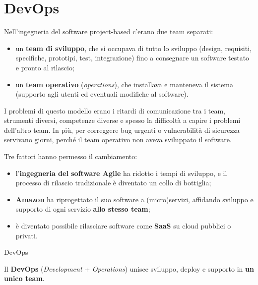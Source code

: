 \chapter{DevOps}\label{ch-10}


Nell'ingegneria del software project-based c'erano due team separati:

\begin{itemize}
\tightlist
\item
  un \textbf{team di sviluppo}, che si occupava di tutto lo sviluppo
  (design, requisiti, specifiche, prototipi, test, integrazione) fino a
  consegnare un software testato e pronto al rilascio;
\item
  un \textbf{team operativo} (\emph{operations}), che installava e
  manteneva il sistema (supporto agli utenti ed eventuali modifiche al
  software).
\end{itemize}

I problemi di questo modello erano i ritardi di comunicazione tra i
team, strumenti diversi, competenze diverse e spesso la difficoltà a
capire i problemi dell'altro team. In più, per correggere bug urgenti o
vulnerabilità di sicurezza servivano giorni, perché il team operativo
non aveva sviluppato il software.

Tre fattori hanno permesso il cambiamento:

\begin{itemize}
\tightlist
\item
  l'\textbf{ingegneria del software Agile} ha ridotto i tempi di
  sviluppo, e il processo di rilascio tradizionale è diventato un collo
  di bottiglia;
\item
  \textbf{Amazon} ha riprogettato il suo software a (micro)servizi,
  affidando sviluppo e supporto di ogni servizio \textbf{allo stesso
  team};
\item
  è diventato possibile rilasciare software come \textbf{SaaS} su cloud
  pubblici o privati.
\end{itemize}

\begin{boxdefinition}{DevOps}

Il \textbf{DevOps} (\emph{Development} + \emph{Operations}) unisce
sviluppo, deploy e supporto in \textbf{un unico team}.

\end{boxdefinition}

